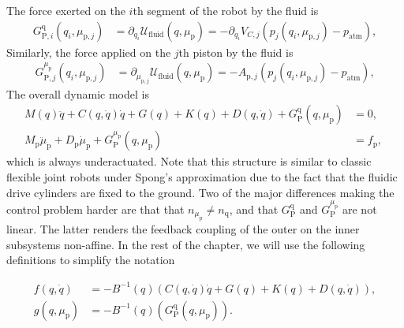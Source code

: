 The force exerted on the $i$th segment of the robot by the fluid is 
%
\begin{equation}\label{eq:backstepping:GPq}
\begin{split}
    G_{\mathrm{P},i}^{\mathrm{q}}(q_i,\mu_{\mathrm{p},j}) &= \partial_{q_i} \mathcal{U}_\mathrm{fluid}(q,\mu_\mathrm{p}) = -\partial_{q_i} V_{C,j} \left ( p_{j}(q_i, \mu_{\mathrm{p},j}) - p_\mathrm{atm} \right ), 
\end{split}
\end{equation}
Similarly, the force applied on the $j$th piston by the fluid is
%
\begin{equation}\label{eq:backstepping:GPmu}
\begin{split}
    G_{\mathrm{P},j}^{\mu_\mathrm{p}}(q_i,\mu_{\mathrm{p},j}) &= \partial_{\mu_{\mathrm{p},j}} \mathcal{U}_\mathrm{fluid}(q,\mu_\mathrm{p}) = - A_{\mathrm{p},j} \left ( p_{j}(q_i, \mu_{\mathrm{p},j}) - p_\mathrm{atm} \right ), 
\end{split}
\end{equation}
%
The overall dynamic model is
%
\begin{equation}\label{eq:backstepping:complete_dyn} %
\begin{split}
	M(q)\ddot{q} \!+\! C(q,\dot{q})\dot{q} \!+\! G(q) \!+\! K(q) \!+\! D(q,\dot{q}) \!+\! G_{\mathrm{P}}^{\mathrm{q}}(q,\mu_\mathrm{p}) &= 0, \\
	M_\mathrm{p} \ddot{\mu}_\mathrm{p} + D_\mathrm{p} \dot{\mu}_\mathrm{p} + G_{\mathrm{P}}^{\mu_\mathrm{p}}(q,\mu_\mathrm{p}) &= f_\mathrm{p}, \; 
\end{split}
\end{equation}
which is always underactuated.
%
Note that this structure is similar to classic flexible joint robots under Spong's approximation \citep{della2021flexible} due to the fact that the fluidic drive cylinders are fixed to the ground. Two of the major differences making the control problem harder are that that $n_{\mu_\mathrm{p}} \neq n_{\mathrm{q}}$, and that $G_{\mathrm{P}}^{\mathrm{q}}$ and $G_{\mathrm{P}}^{\mu_\mathrm{p}}$ are not linear.
The latter renders the feedback coupling of the outer on the inner subsystems non-affine.
%
In the rest of the chapter, we will use the following definitions to simplify the notation
%
\begin{small}
\begin{equation}\label{eq:backstepping:gf}
\begin{split}
	f(q,\dot{q}) &= - B^{-1}(q)\left(C(q,\dot{q})\dot{q} + G(q) + K(q) + D(q, \dot{q}) \right), \\
	g(q,\mu_\mathrm{p}) &= - B^{-1}(q) \left ( G_{\mathrm{P}}^{\mathrm{q}}(q,\mu_\mathrm{p}) \right ).
\end{split}
\end{equation}
\end{small}